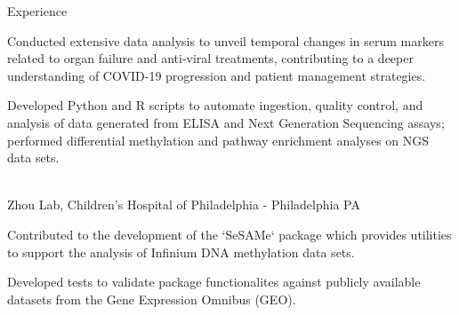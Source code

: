 \documentclass[]{resume-knyte}
\begin{document}
\begin{topic}{Experience}
{        \item Conducted extensive data analysis to unveil temporal changes in serum markers related to organ failure and anti-viral treatments, contributing to a deeper understanding of COVID-19 progression and patient management strategies.
        \vspace{-5pt}
    
        \item Developed Python and R scripts to automate ingestion, quality control, and analysis of data generated from ELISA and Next Generation Sequencing assays; performed differential methylation and pathway enrichment analyses on NGS data sets.
        \vspace{-5pt}
    }\\

    {Zhou Lab, Children's Hospital of Philadelphia - Philadelphia PA}
    {
        \item Contributed to the development of the `SeSAMe` package which provides utilities to support the analysis of Infinium DNA methylation data sets.
        \vspace{-5pt}

        \item Developed tests to validate package functionalites against publicly available datasets from the Gene Expression Omnibus (GEO).
        \vspace{-5pt}
    }\\
\end{topic}
\end{document}
